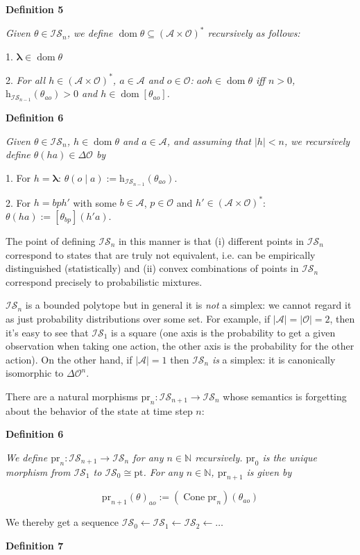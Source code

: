 \documentclass[a4paper]{article}
\newcommand{\Co}[1]{}
\DeclareMathOperator{\Dom}{dom}
\newcommand{\AP}[1]{\left(#1\right)}
\newcommand{\AB}[1]{\left[#1\right]}
\newcommand{\Nats}{\mathbb{N}}
\newcommand{\Pt}{\boldsymbol{\mathrm{pt}}}
\newcommand{\Estr}{\boldsymbol{\lambda}}
\newcommand{\Abs}[1]{\left\vert #1 \right\vert}
\newcommand{\A}{\mathcal{A}}
\newcommand{\Ob}{\mathcal{O}}
\newcommand{\FH}{\AP{\A\times\Ob}^*}
\DeclareMathOperator{\Cone}{Cone}
\newcommand{\Ht}{\mathrm{h}}
\newcommand{\IS}{\mathcal{IS}}
\newcommand{\Prj}{\mathrm{pr}}
\begin{document}
\textbf{Definition 5}\Co{b}

\textit{Given $\theta\in\IS_n$, we define $\Dom\theta\subseteq\FH$ recursively as follows:}

1. $\Estr\in\Dom\theta$

2. \textit{For all $h\in\FH$, $a\in\A$ and $o\in\Ob$: $aoh\in\Dom\theta$ iff $n>0$, $\Ht_{\IS_{n-1}}(\theta_{ao})>0$ and $h\in\Dom\AB{\theta_{ao}}$.}

\textbf{Definition 6}

\textit{Given $\theta\in\IS_n$, $h\in\Dom\theta$ and $a\in\A$, and assuming that $\Abs{h}<n$, we recursively define $\theta(ha)\in\Delta\Ob$ by}\Co{i}

1. For $h=\Estr$: $\theta( o\mid a):=\Ht_{\IS_{n-1}}(\theta_{ao})$.

2. For $h=bph'$ with some $b\in\A$, $p\in\Ob$ and $h'\in\FH$: $\theta(ha):=\AB{\theta_{bp}}(h'a)$.

The point of defining $\IS_n$ in this manner is that (i) different points in $\IS_n$ correspond to states that are truly not equivalent, i.e. can be empirically distinguished (statistically) and (ii) convex combinations of points in $\IS_n$ correspond precisely to probabilistic mixtures. 

$\IS_n$ is a bounded polytope but in general it is \textit{not} a simplex: we cannot regard it as just probability distributions over some set. For example, if $\Abs{\A}=\Abs{\Ob}=2$, then it's easy to see that $\IS_1$ is a square (one axis is the probability to get a given observation when taking one action, the other axis is the probability for the other action). On the other hand, if $\Abs{\A}=1$ then $\IS_n$ \textit{is}\Co{i} a simplex: it is canonically isomorphic to $\Delta\Ob^n$.

There are a natural morphisms $\Prj_n:\IS_{n+1}\rightarrow\IS_n$ whose semantics is forgetting about the behavior of the state at time step $n$:

\textbf{Definition 6}\Co{b}

\textit{We define $\Prj_n:\IS_{n+1}\rightarrow\IS_n$ for any $n\in\Nats$ recursively. $\Prj_0$ is the unique morphism from $\IS_1$ to $\IS_0\cong\Pt$. For any $n\in\Nats$, $\Prj_{n+1}$ is given by}\Co{i}

$$\Prj_{n+1}(\theta)_{ao}:=\AP{\Cone{\Prj_n}}\AP{\theta_{ao}}$$

We thereby get a sequence $\IS_0 \leftarrow \IS_1 \leftarrow \IS_2 \leftarrow \ldots$

\textbf{Definition 7}\Co{b}
\end{document}
